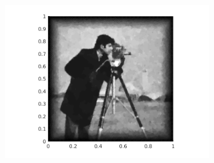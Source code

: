 \begin{figure}[h]
\begin{subfigure}{.3\linewidth}
    \includegraphics[trim = 60 0 60 20, clip, width=\linewidth]
      {pictures/introBeta/snr10/02500.png}
    \label{fig:snr10alpha2500}
  \end{subfigure}


\end{figure}
